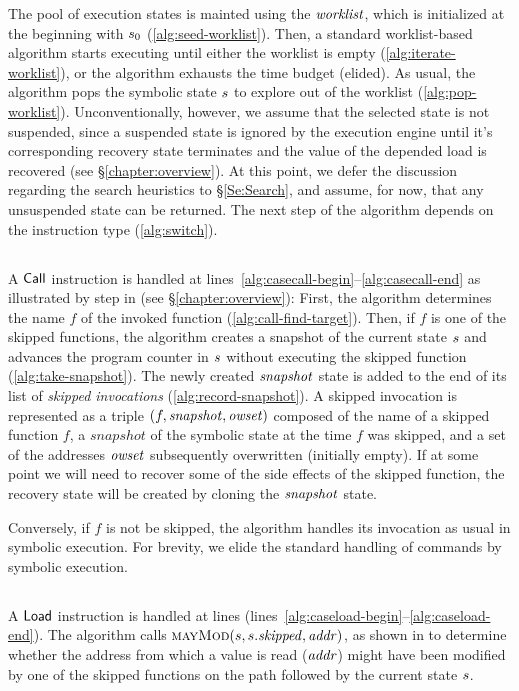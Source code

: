 The pool of execution states is mainted using the $\mathit{worklist}$,
which is initialized at the beginning with $s_0$ (\cref{alg:seed-worklist}).
Then, a standard worklist-based algorithm starts executing until either the
worklist is empty (\cref{alg:iterate-worklist}), or the algorithm
exhausts the time budget (elided). As usual, the algorithm pops the
symbolic state $s$ to explore out of the worklist
(\cref{alg:pop-worklist}).
Unconventionally, however, we assume that
the selected state is not suspended, since a suspended state is ignored by the execution engine
until it's corresponding recovery state terminates
and the value of the depended load is recovered (see \S\ref{chapter:overview}).
At this point, we defer the discussion regarding the search heuristics to \S\ref{Se:Search},
and assume, for now, that any unsuspended state can be returned.
The next step of the algorithm depends on the instruction type (\cref{alg:switch}).

\subsection{}
A $\mathsf{Call}$ instruction is handled at lines~\ref{alg:casecall-begin}--\ref{alg:casecall-end} as illustrated by step
 in  (see \S\ref{chapter:overview}):
First, the algorithm determines the name $f$ of the invoked function
(\cref{alg:call-find-target}). Then, if $f$ is one of the skipped
functions, the algorithm creates a snapshot of the current state
$s$ and advances the program counter in $s$
without executing the skipped function (\cref{alg:take-snapshot}).
The newly created $\mathit{snapshot}$ state is added to the end of its list 
of \emph{skipped invocations} (\cref{alg:record-snapshot}).
A skipped invocation is represented
as a triple $(f,\mathit{snapshot},\mathit{owset})$ composed of the name of a skipped
function $f$, a $snapshot$ of the symbolic state at the time $f$ was
skipped, and a set of the addresses $\mathit{owset}$ subsequently overwritten
(initially empty).
If at some point we will need to recover some of the side effects
of the skipped function, the recovery state will be created
by cloning the $\mathit{snapshot}$ state.

Conversely, if $f$ is not be skipped, the algorithm handles its
invocation as usual in symbolic execution.  For brevity, we elide the
standard handling of commands by symbolic execution.

\subsection{}
A $\mathsf{Load}$ instruction is handled
at lines {(lines~\ref{alg:caseload-begin}--\ref{alg:caseload-end})}.
The algorithm calls $\Call{mayMod}{\workstate,\workstate.\skipped,\addr}$,
as shown in 
to determine whether the address from
which a value is read ($\mathit{addr}$) might have been modified by one of the
skipped functions on the path followed by the current state $s$.

